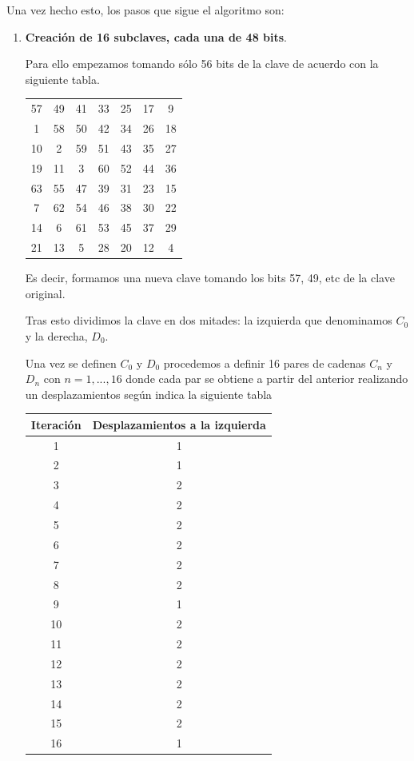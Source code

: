 \documentclass[nochap]{apuntesURJC}
\begin{document}
Una vez hecho esto, los pasos que sigue el algoritmo son:
\begin{enumerate}
\item \textbf{Creación de 16 subclaves, cada una de 48 bits}.

Para ello empezamos tomando sólo 56 bits de la clave de acuerdo con la siguiente tabla.

\begin{center}
\begin{tabular}{ccccccc}
57 &  49 &   41 &  33 &   25  &  17 &   9\\
1  & 58  &  50  & 42  &  34   & 26  & 18\\
10 &   2 &   59 &  51 &   43  &  35 &  27\\
19 &  11 &    3 &  60 &   52  &  44 &  36\\
63 &  55 &   47 &  39 &   31  &  23 &  15\\
7  & 62  &  54  & 46  &  38   & 30  & 22\\
14 &   6 &   61 &  53 &   45  &  37 &  29\\
21 &  13 &    5 &  28 &   20  &  12 &   4
\end{tabular}
\end{center}

Es decir, formamos una nueva clave tomando los bits 57, 49, etc de la clave original.

Tras esto dividimos la clave en dos mitades: la izquierda que denominamos $C_0$ y la derecha, $D_0$.

Una vez se definen $C_0$ y $D_0$ procedemos a definir 16 pares de cadenas $C_n$ y $D_n$ con $n = 1, ..., 16$ donde cada par se obtiene a partir del anterior realizando un desplazamientos según indica la siguiente tabla

\begin{center}
\begin{tabular}{cc}
Iteración & Desplazamientos a la izquierda \\
\hline
1  & 1 \\
2  & 1 \\
3  & 2 \\
4  & 2 \\
5  & 2 \\
6  & 2 \\
7  & 2 \\
8  & 2 \\
9  & 1 \\
10 &  2 \\
11 &  2 \\
12 &  2 \\
13 &  2 \\
14 &  2 \\
15 &  2 \\
16 &  1
\end{tabular}
\end{center}


\end{enumerate}
\end{document}
